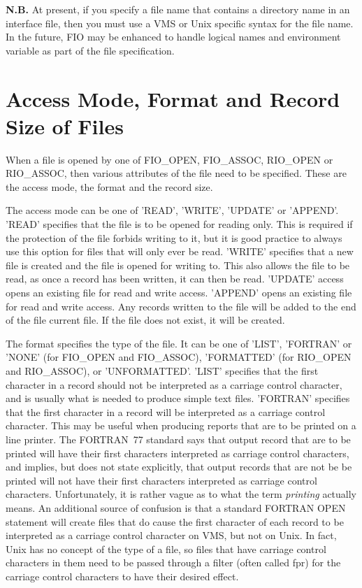 {\bf N.B.} At present, if you specify a file name that contains a directory
name in an interface file, then you must use a VMS or Unix specific syntax for
the file name.
In the future, FIO may be enhanced to handle logical names and environment
variable as part of the file specification.

\section{Access Mode, Format and Record Size of Files}

When a file is opened by one of FIO\_OPEN, FIO\_ASSOC, RIO\_OPEN or
RIO\_ASSOC, then various attributes of the file need to be specified. These are
the access mode, the format and the record size.

The access mode can be one of 'READ', 'WRITE', 'UPDATE' or 'APPEND'. 'READ'
specifies that the file is to be opened for reading only. This is required if
the protection of the file forbids writing to it, but it is good practice to
always use this option for files that will only ever be read. 'WRITE' specifies
that a new file is created and the file is opened for writing to. This also
allows the file to be read, as once a record has been written, it can then be
read. 'UPDATE' access opens an existing file for read and write access.
'APPEND' opens an existing file for read and write access. Any records written
to the file will be added to the end of the file current file. If the file does
not exist, it will be created.

The format specifies the type of the file. It can be one of 'LIST', 'FORTRAN'
or 'NONE' (for FIO\_OPEN and FIO\_ASSOC), 'FORMATTED' (for RIO\_OPEN and
RIO\_ASSOC), or 'UNFORMATTED'. 'LIST' specifies that the first character in a
record should not be interpreted as a carriage control character, and is
usually what is needed to produce simple text files. 'FORTRAN' specifies that
the first character in a record will be interpreted as a carriage control
character. This may be useful when producing reports that are to be printed on
a line printer. The FORTRAN~77 standard says that output record that are to be
printed will have their first characters interpreted as carriage control
characters, and implies, but does not state explicitly, that output records that
are not be be printed will not have their first characters interpreted as
carriage control characters. Unfortunately, it is rather vague as to what the
term {\em printing\/} actually means. An additional source of confusion is that
a standard FORTRAN OPEN statement will create files that do cause the first
character of each record to be interpreted as a carriage control character on
VMS, but not on Unix. In fact, Unix has no concept of the type of a file, so
files that have carriage control characters in them need to be passed through a
filter (often called fpr) for the carriage control characters to have their
desired effect.

